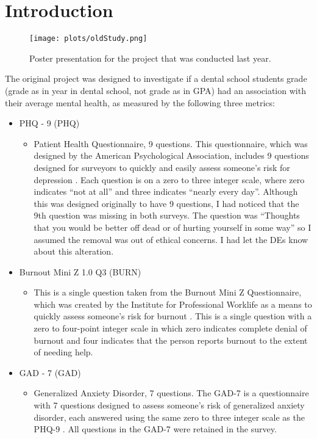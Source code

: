 \documentclass{article}
\begin{document}
\section{Introduction}

\begin{figure}[H]
    \centering
    \texttt{[image: plots/oldStudy.png]}
    \caption{Poster presentation for the project that was conducted last year.}
    \label{fig:oldStudy}
\end{figure}

The original project was designed to investigate if a dental school students grade (grade as in year in dental school, not grade as in GPA) had an association with their average mental health, as measured by the following three metrics:


\begin{itemize}
    \item PHQ - 9 (PHQ)
        \begin{itemize}
        \item Patient Health Questionnaire, 9 questions. This questionnaire, which was designed by the American Psychological Association, includes 9 questions designed for surveyors to quickly and easily assess someone's risk for depression \cite{kroenke1999phq9}. Each question is on a zero to three integer scale, where zero indicates ``not at all'' and three indicates ``nearly every day''. Although this was designed originally to have 9 questions, I had noticed that the 9th question was missing in both surveys. The question was ``Thoughts that you would be better off dead or of hurting yourself in some way'' so I assumed the removal was out of ethical concerns. I had let the DEs know about this alteration.
        \end{itemize}
    \item Burnout Mini Z 1.0 Q3 (BURN)
        \begin{itemize}
        \item This is a single question taken from the Burnout Mini Z Questionnaire, which was created by the Institute for Professional Worklife as a means to quickly assess someone's risk for burnout \cite{shaholli2024miniz}. This is a single question with a zero to four-point integer scale in which zero indicates complete denial of burnout and four indicates that the person reports burnout to the extent of needing help.
        \end{itemize}
    \item GAD - 7 (GAD)
        \begin{itemize}
        \item Generalized Anxiety Disorder, 7 questions. The GAD-7 is a questionnaire with 7 questions designed to assess someone's risk of generalized anxiety disorder, each answered using the same zero to three integer scale as the PHQ-9 \cite{spitzer2006gad7}. All questions in the GAD-7 were retained in the survey.
        \end{itemize} 
\end{itemize}
\end{document}
